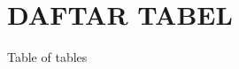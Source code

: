 \documentclass[main]{subfiles}
\begin{document}
\chapter*{DAFTAR TABEL}
Table of tables
\end{document}
